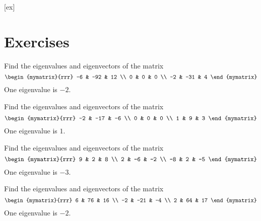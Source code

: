 [ex]
\section*{Exercises}

\begin{enumialphparenastyle}

\begin{ex} Find the eigenvalues and eigenvectors of the matrix 
\begin{equation*}
\begin{mymatrix}{rrr}
-6 & -92 & 12 \\
0 & 0 & 0 \\
-2 & -31 & 4
\end{mymatrix}
\end{equation*}
One eigenvalue is $-2$.
\end{ex}


\begin{ex} Find the eigenvalues and eigenvectors of the matrix 
\begin{equation*}
\begin{mymatrix}{rrr}
-2 & -17 & -6 \\
0 & 0 & 0 \\
1 & 9 & 3
\end{mymatrix}
\end{equation*}
One eigenvalue is $1$. 
\end{ex}

\begin{ex} Find the eigenvalues and eigenvectors of the matrix 
\begin{equation*}
\begin{mymatrix}{rrr}
9 & 2 & 8 \\
2 & -6 & -2 \\
-8 & 2 & -5
\end{mymatrix}
\end{equation*}
One eigenvalue is $-3$. 
\end{ex}

\begin{ex} Find the eigenvalues and eigenvectors of the matrix 
\begin{equation*}
\begin{mymatrix}{rrr}
6 & 76 & 16 \\
-2 & -21 & -4 \\
2 & 64 & 17
\end{mymatrix}
\end{equation*}
One eigenvalue is $-2$. 
\end{ex}


\end{enumialphparenastyle}
